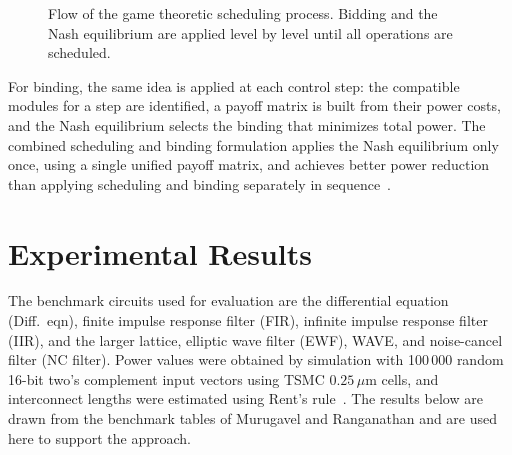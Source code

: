 \documentclass[conference]{IEEEtran}
\begin{document}
\begin{figure}[t]
\centering
{}
\caption{Flow of the game theoretic scheduling process. Bidding and the
Nash equilibrium are applied level by level until all operations are
scheduled.}
\label{fig:flow}
\end{figure}

For binding, the same idea is applied at each control step: the
compatible modules for a step are identified, a payoff matrix is built
from their power costs, and the Nash equilibrium selects the binding
that minimizes total power. The combined scheduling and binding
formulation applies the Nash equilibrium only once, using a single
unified payoff matrix, and achieves better power reduction than
applying scheduling and binding separately in
sequence~\cite{murugavel2003}.

\section{Experimental Results}

The benchmark circuits used for evaluation are the differential
equation (Diff.\ eqn), finite impulse response filter (FIR), infinite
impulse response filter (IIR), and the larger lattice, elliptic wave
filter (EWF), WAVE, and noise-cancel filter (NC filter). Power values
were obtained by simulation with 100\,000 random 16-bit two's
complement input vectors using TSMC $0.25\,\mu\mathrm{m}$ cells, and
interconnect lengths were estimated using Rent's
rule~\cite{murugavel2003}. The results below are drawn from the
benchmark tables of Murugavel and Ranganathan and are used here to
support the approach.
\end{document}
